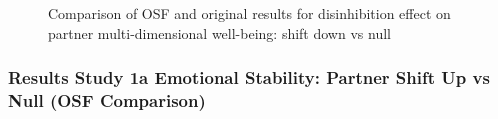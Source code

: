 \documentclass[
  singlecolumn]{article}
\begin{document}
\begin{figure}


\caption{\label{fig-results-disinhibition-partner-down-comparison}Comparison
of OSF and original results for disinhibition effect on partner
multi-dimensional well-being: shift down vs null}

\end{figure}%

\newpage{}

\subsubsection{Results Study 1a Emotional Stability: Partner Shift Up vs
Null (OSF
Comparison)}\label{results-study-1a-emotional-stability-partner-shift-up-vs-null-osf-comparison}
\end{document}
